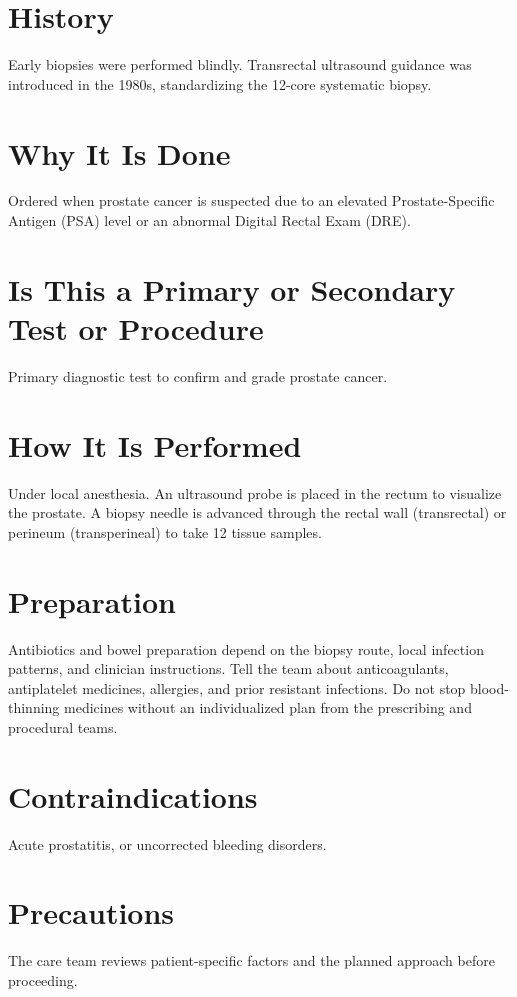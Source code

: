 \section*{History}
Early biopsies were performed blindly. Transrectal ultrasound guidance was introduced in the 1980s, standardizing the 12-core systematic biopsy.

\section*{Why It Is Done}
Ordered when prostate cancer is suspected due to an elevated Prostate-Specific Antigen (PSA) level or an abnormal Digital Rectal Exam (DRE).

\section*{Is This a Primary or Secondary Test or Procedure}
Primary diagnostic test to confirm and grade prostate cancer.

\section*{How It Is Performed}
Under local anesthesia. An ultrasound probe is placed in the rectum to visualize the prostate. A biopsy needle is advanced through the rectal wall (transrectal) or perineum (transperineal) to take 12 tissue samples.

\section*{Preparation}
Antibiotics and bowel preparation depend on the biopsy route, local infection patterns, and clinician instructions. Tell the team about anticoagulants, antiplatelet medicines, allergies, and prior resistant infections. Do not stop blood-thinning medicines without an individualized plan from the prescribing and procedural teams.

\section*{Contraindications}
Acute prostatitis, or uncorrected bleeding disorders.

\section*{Precautions}
The care team reviews patient-specific factors and the planned approach before proceeding.

